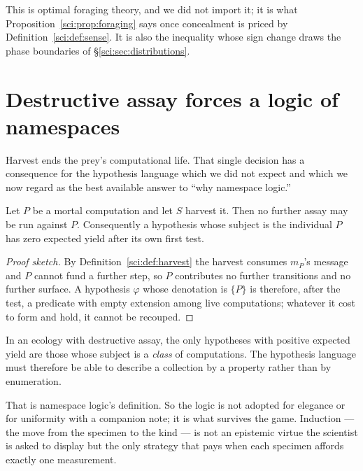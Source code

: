 This is optimal foraging theory, and we did not import it; it is what Proposition~\ref{sci:prop:foraging}
says once concealment is priced by Definition~\ref{sci:def:sense}. It is also the inequality whose sign
change draws the phase boundaries of \S\ref{sci:sec:distributions}.

\section{Destructive assay forces a logic of namespaces}\label{sci:S8}
\label{sci:sec:forced}

Harvest ends the prey's computational life. That single decision has a consequence for the hypothesis
language which we did not expect and which we now regard as the best available answer to ``why
namespace logic.''

\begin{proposition}
\label{sci:prop:onespecimen}
Let $P$ be a mortal computation and let $S$ harvest it. Then no further assay may be run against $P$.
Consequently a hypothesis whose subject is the individual $P$ has zero expected yield after its own
first test.
\end{proposition}

\begin{proof}[Proof sketch]
By Definition~\ref{sci:def:harvest} the harvest consumes $m_P$'s message and $P$ cannot fund a further
step, so $P$ contributes no further transitions and no further surface. A hypothesis $\varphi$ whose
denotation is $\{P\}$ is therefore, after the test, a predicate with empty extension among live
computations; whatever it cost to form and hold, it cannot be recouped.
\end{proof}

\begin{corollary}
\label{sci:cor:induction}
In an ecology with destructive assay, the only hypotheses with positive expected yield are those whose
subject is a \emph{class} of computations. The hypothesis language must therefore be able to describe
a collection by a property rather than by enumeration.
\end{corollary}

That is namespace logic's definition. So the logic is not adopted for elegance or for uniformity with
a companion note; it is what survives the game. Induction --- the move from the specimen to the kind
--- is not an epistemic virtue the scientist is asked to display but the only strategy that pays when
each specimen affords exactly one measurement.

